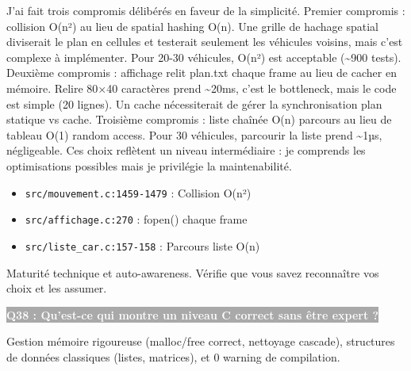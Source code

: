 \documentclass[12pt,a4paper]{article}
\newcommand{\question}[1]{%
    \vspace{0.5cm}
    \noindent\colorbox{darkgray}{\textcolor{white}{\textbf{#1}}}
    \vspace{0.3cm}
}
\begin{document}
\begin{reponse_longue}
J'ai fait trois compromis délibérés en faveur de la simplicité. Premier compromis : collision O(n²) au lieu de spatial hashing O(n). Une grille de hachage spatial diviserait le plan en cellules et testerait seulement les véhicules voisins, mais c'est complexe à implémenter. Pour 20-30 véhicules, O(n²) est acceptable (\textasciitilde{}900 tests). Deuxième compromis : affichage relit plan.txt chaque frame au lieu de cacher en mémoire. Relire 80×40 caractères prend \textasciitilde{}20ms, c'est le bottleneck, mais le code est simple (20 lignes). Un cache nécessiterait de gérer la synchronisation plan statique vs cache. Troisième compromis : liste chaînée O(n) parcours au lieu de tableau O(1) random access. Pour 30 véhicules, parcourir la liste prend \textasciitilde{}1µs, négligeable. Ces choix reflètent un niveau intermédiaire : je comprends les optimisations possibles mais je privilégie la maintenabilité.
\end{reponse_longue}

\begin{reference_code}
\begin{itemize}
    \item \texttt{src/mouvement.c:1459-1479} : Collision O(n²)
    \item \texttt{src/affichage.c:270} : fopen() chaque frame
    \item \texttt{src/liste\_car.c:157-158} : Parcours liste O(n)
\end{itemize}
\end{reference_code}

\begin{objectif_prof}
Maturité technique et auto-awareness. Vérifie que vous savez reconnaître vos choix et les assumer.
\end{objectif_prof}

\question{Q38 : Qu'est-ce qui montre un niveau C correct sans être expert ?}

\begin{reponse_courte}
Gestion mémoire rigoureuse (malloc/free correct, nettoyage cascade), structures de données classiques (listes, matrices), et 0 warning de compilation.
\end{reponse_courte}
\end{document}
